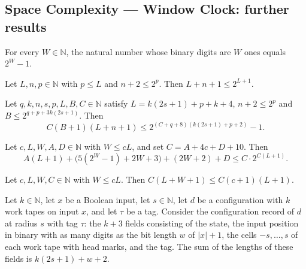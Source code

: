 \subsection*{Space Complexity --- Window Clock: further results}

\begin{lemma}
\label{Turing.cw_true_value}
\leanok
{}
For every $W\in\mathbb{N}$, the natural number whose binary digits are $W$ ones equals $2^W-1$.
\end{lemma}

\begin{lemma}
\label{Turing.cw_round_cost}
\leanok
{}
Let $L,n,p\in\mathbb{N}$ with $p\le L$ and $n+2\le 2^p$. Then $L+n+1\le 2^{L+1}$.
\end{lemma}

\begin{lemma}
\label{Turing.cw_budget}
\leanok
{}
Let $q,k,n,s,p,L,B,C\in\mathbb{N}$ satisfy $L=k(2s+1)+p+k+4$, $n+2\le 2^p$ and $B\le
2^{q+p+3k(2s+1)}$. Then \[C(B+1)(L+n+1)\le 2^{(C+q+8)(k(2s+1)+p+2)}-1.\]
\end{lemma}

\begin{lemma}
\label{Turing.cw_time_bound}
\leanok
{}
Let $c,L,W,A,D\in\mathbb{N}$ with $W\le cL$, and set $C=A+4c+D+10$. Then
\[A(L+1)+\bigl(5(2^W-1)+2W+3\bigr)+(2W+2)+D\le C\cdot 2^{C(L+1)}.\]
\end{lemma}

\begin{lemma}
\label{Turing.cw_head_bound}
\leanok
{}
Let $c,L,W,C\in\mathbb{N}$ with $W\le cL$. Then $C(L+W+1)\le C(c+1)(L+1)$.
\end{lemma}

\begin{lemma}
\label{Turing.cw_field_total}
\leanok
{}
Let $k\in\mathbb{N}$, let $x$ be a Boolean input, let $s\in\mathbb{N}$, let $d$ be a
configuration with $k$ work tapes on input $x$, and let $\tau$ be a tag. Consider the
configuration record of $d$ at radius $s$ with tag $\tau$: the $k+3$ fields consisting of the
state, the input position in binary with as many digits as the bit length $w$ of $|x|+1$, the
cells $-s,\dots,s$ of each work tape with head marks, and the tag. The sum of the lengths of
these fields is $k(2s+1)+w+2$.
\end{lemma}

